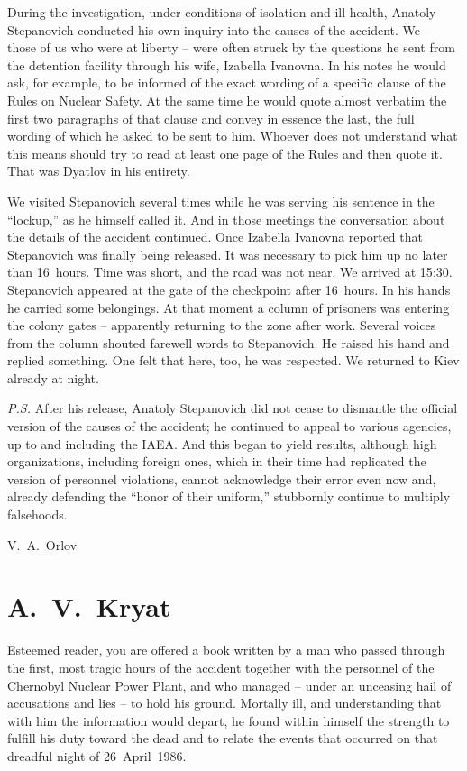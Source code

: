 \documentclass[openright]{bookest}
\begin{document}
During the investigation, under conditions of isolation and ill health, Anatoly Stepanovich conducted his own inquiry into the causes of the accident. We -- those of us who were at liberty -- were often struck by the questions he sent from the detention facility through his wife, Izabella Ivanovna. In his notes he would ask, for example, to be informed of the exact wording of a specific clause of the Rules on Nuclear Safety. At the same time he would quote almost verbatim the first two paragraphs of that clause and convey in essence the last, the full wording of which he asked to be sent to him. Whoever does not understand what this means should try to read at least one page of the Rules and then quote it. That was Dyatlov in his entirety.

We visited Stepanovich several times while he was serving his sentence in the ``lockup,'' as he himself called it. And in those meetings the conversation about the details of the accident continued. Once Izabella Ivanovna reported that Stepanovich was finally being released. It was necessary to pick him up no later than 16~hours. Time was short, and the road was not near. We arrived at 15{:}30. Stepanovich appeared at the gate of the checkpoint after 16~hours. In his hands he carried some belongings. At that moment a column of prisoners was entering the colony gates -- apparently returning to the zone after work. Several voices from the column shouted farewell words to Stepanovich. He raised his hand and replied something. One felt that here, too, he was respected. We returned to Kiev already at night.

\textit{P.S.} After his release, Anatoly Stepanovich did not cease to dismantle the official version of the causes of the accident; he continued to appeal to various agencies, up to and including the IAEA. And this began to yield results, although high organizations, including foreign ones, which in their time had replicated the version of personnel violations, cannot acknowledge their error even now and, already defending the ``honor of their uniform,'' stubbornly continue to multiply falsehoods.

\begin{flushright}
V.~A.~Orlov
\end{flushright}

\section*{A.~V.~Kryat}

Esteemed reader, you are offered a book written by a man who passed through the first, most tragic hours of the accident together with the personnel of the Chernobyl Nuclear Power Plant, and who managed -- under an unceasing hail of accusations and lies -- to hold his ground. Mortally ill, and understanding that with him the information would depart, he found within himself the strength to fulfill his duty toward the dead and to relate the events that occurred on that dreadful night of 26~April~1986.
\end{document}
